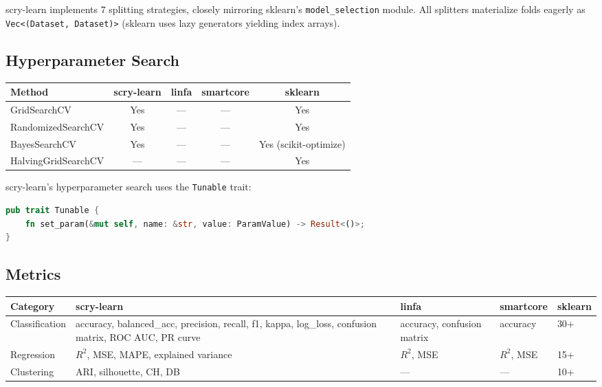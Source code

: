 \documentclass[11pt,a4paper]{article}
\begin{document}
scry-learn implements 7 splitting strategies, closely mirroring sklearn's \texttt{model\_selection} module. All splitters materialize folds eagerly as \texttt{Vec<(Dataset, Dataset)>} (sklearn uses lazy generators yielding index arrays).

\subsection{Hyperparameter Search}

\begin{center}
\begin{tabular}{lcccc}
\toprule
\textbf{Method} & \textbf{scry-learn} & \textbf{linfa} & \textbf{smartcore} & \textbf{sklearn} \\
\midrule
GridSearchCV & Yes & --- & --- & Yes \\
RandomizedSearchCV & Yes & --- & --- & Yes \\
BayesSearchCV & Yes & --- & --- & Yes (scikit-optimize) \\
HalvingGridSearchCV & --- & --- & --- & Yes \\
\bottomrule
\end{tabular}
\end{center}

scry-learn's hyperparameter search uses the \texttt{Tunable} trait:

\begin{lstlisting}[language=Rust]
pub trait Tunable {
    fn set_param(&mut self, name: &str, value: ParamValue) -> Result<()>;
}
\end{lstlisting}

\subsection{Metrics}

\begin{center}
\begin{tabular}{lp{3.5cm}p{2cm}p{1.5cm}p{2cm}}
\toprule
\textbf{Category} & \textbf{scry-learn} & \textbf{linfa} & \textbf{smartcore} & \textbf{sklearn} \\
\midrule
Classification & accuracy, balanced\_acc, precision, recall, f1, kappa, log\_loss, confusion matrix, ROC AUC, PR curve & accuracy, confusion matrix & accuracy & 30+ \\
Regression & $R^2$, MSE, MAPE, explained variance & $R^2$, MSE & $R^2$, MSE & 15+ \\
Clustering & ARI, silhouette, CH, DB & --- & --- & 10+ \\
\bottomrule
\end{tabular}
\end{center}
\end{document}
